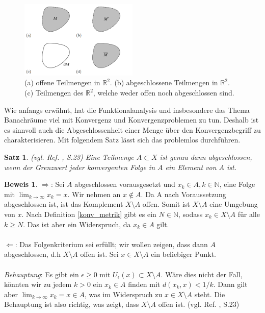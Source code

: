 \documentclass[10pt,a4paper]{article}
\theoremstyle{plain}
\newtheorem{satz}{Satz}[section]
\newenvironment{sa}{\begin{shaded}\begin{satz}}{\end{satz}\end{shaded}}
\theoremstyle{definition}
\theoremstyle{nonumberplain}
\newtheorem{beweis}{Beweis}
\newenvironment{bew}{\begin{beweis}}{\end{beweis}}
\newcommand{\N}{\mathbb{N}}
\newcommand{\R}{\mathbb{R}}
\begin{document}
\begin{figure}[h]
\centering
\includegraphics[width=0.50\textwidth]{pictures/innerer-abschluss.png}
\caption{(a) offene Teilmengen in $\R^2$. (b) abgeschlossene Teilmengen in $\R^2$. (c) Teilmengen des $\R^2$, welche weder offen noch abgeschlossen sind. \cite{OffeneAbgeschlosseneMengen}}
\end{figure}
\newpage
\noindent Wie anfangs erwähnt, hat die Funktionalanalysis und insbesondere das Thema Banachräume viel mit Konvergenz und Konvergenzproblemen zu tun. Deshalb ist es sinnvoll auch die Abgeschlossenheit einer Menge über den Konvergenzbegriff zu charakterisieren. Mit folgendem Satz lässt sich das problemlos durchführen.
\begin{sa}
(vgl. Ref. \cite{Forster}, S.23) Eine Teilmenge $A \subset X$ ist genau dann abgeschlossen, wenn der Grenzwert jeder konvergenten Folge in $A$ ein Element von $A$ ist.
\end{sa}
\begin{bew}
$\Rightarrow$: Sei $A$ abgeschlossen vorausgesetzt und $x_k \in A, k \in \N$, eine Folge mit $\lim_{k \to \infty}{x_k} = x$. Wir nehmen an $x \notin A$. Da A nach Voraussetzung abgeschlossen ist, ist das Komplement $X \setminus A$ offen. Somit ist $X \setminus A$ eine Umgebung von $x$. Nach Definition \hyperref[konv_metrik]{\ref*{konv_metrik}} gibt es ein $N \in \N$, sodass $x_k \in X \setminus A$ für alle $k \geq N$. Das ist aber ein Widerspruch, da $x_k \in A$ gilt.\\\\
$\Leftarrow$: Das Folgenkriterium sei erfüllt; wir wollen zeigen, dass dann $A$ abgeschlossen, d.h $X \setminus A$ offen ist. Sei $x \in X \setminus A$ ein beliebiger Punkt.\\\\
\textit{Behauptung}: Es gibt ein $\epsilon \geq 0$ mit $U_\epsilon(x) \subset X \setminus A$. Wäre dies nicht der Fall, könnten wir zu jedem $k > 0$ ein $x_k \in A$ finden mit $d(x_k,x) < 1/k$. Dann gilt aber $\lim_{k \to \infty}{x_k} = x \in A$, was im Widerspruch zu $x \in X \setminus A$ steht. Die Behauptung ist also richtig, was zeigt, dass $X \setminus A$ offen ist. (vgl. Ref. \cite{Forster}, S.23)
\end{bew}
\end{document}
